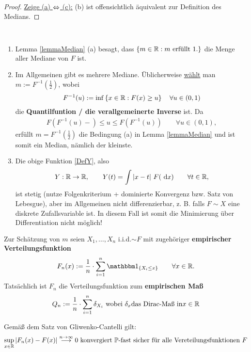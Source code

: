 \begin{proof}
\underline{Zeige (a) $\Leftrightarrow$ (c):}
(b) ist offensichtlich äquivalent zur Definition des Medians.
\end{proof}

\begin{bemerkungnr}\
\begin{enumerate}
\item Lemma \ref{lemmaMedian} (a) besagt, dass $\lbrace m\in\mathbb{R}: m\text{ erfüllt } 1.\rbrace$ die Menge aller Mediane von $F$ ist.
\item Im Allgemeinen gibt es mehrere Mediane. Üblicherweise \underline{wählt} man $m:=F^{-1}(\frac{1}{2})$, wobei
\begin{align*}
F^{-1}(u):=\inf\left\lbrace x\in\mathbb{R}:F(x)\geq u\right\rbrace\quad\forall u\in (0,1)
\end{align*}
die \textbf{Quantilfuntion / die verallgemeinerte Inverse} ist. Da
\begin{align*}
F\left(F^{-1}(u)-\right)\leq u\leq F\left(F^{-1}(u)\right)\qquad\forall u\in (0,1),
\end{align*}
erfüllt $m=F^{-1}\left(\frac{1}{2}\right)$ die Bedingung (a) in Lemma \ref{lemmaMedian} und ist somit ein Median, nämlich der kleinste.
\item Die obige Funktion \eqref{DefY}, also
\begin{align*}
Y:\mathbb{R}\to\mathbb{R},\qquad Y(t)=\int\limits|x-t|~F(\text{ d} x)\qquad\forall t\in\mathbb{R},
\end{align*}
ist stetig (nutze Folgenkriterium + dominierte Konvergenz bzw. Satz von Lebesgue), aber im Allgemeinen nicht differenzierbar, z. B. falls $F\sim X$ eine diskrete Zufallsvariable ist. In diesem Fall ist somit die Minimierung über Differentiation nicht möglich!
\end{enumerate}
\end{bemerkungnr}

Zur Schätzung von $m$ seien $X_1,\ldots, X_n$ i.i.d.$\sim F$ mit zugehöriger \textbf{empirischer Verteilungsfunktion}
\begin{align*}
F_n(x):=\frac{1}{n}\cdot\sum\limits_{i=1}^n\indi_{\lbrace X_i\leq x\rbrace}\qquad\forall x\in\R.
\end{align*}
Tatsächlich ist $F_n$ die Verteilungsfunktion zum \textbf{empirischen Maß}
\begin{align*}
Q_n:=\frac{1}{n}\cdot\sum\limits_{i=1}^n\delta_{X_i}\text{ wobei }\delta_x\text {das Dirac-Maß in}x\in\mathbb{R}
\end{align*}

Gemäß dem Satz von Gliwenko-Cantelli gilt:
\begin{align*}
\sup\limits_{x\in\mathbb{R}}|F_n(x)-F(x)|\stackrel{n\to\infty}{\longrightarrow}0\text{ konvergiert $\mathbb{P}$-fast sicher für alle Vereteilungsfunktionen }F
\end{align*}

